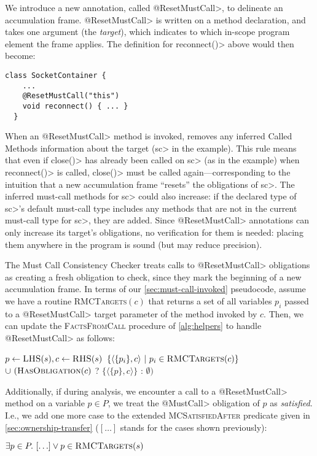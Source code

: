 We introduce a new annotation, called \<@ResetMustCall>, to delineate
an accumulation frame. \<@ResetMustCall> is written on a method
declaration, and takes one argument (the \emph{target}), which
indicates to which in-scope program element the frame applies. The
definition for \<reconnect()> above would then become:

\begin{lstlisting}[frame=tb,belowskip=3mm]
  class SocketContainer {
    ...
    @ResetMustCall("this")
    void reconnect() { ... }
  }
\end{lstlisting}
When an \<@ResetMustCall>
method is invoked, \Tool removes any
inferred Called Methods information about the target (\<sc> in the example).
This rule means that even if \<close()> has already been called on \<sc>
(as in the example)
when \<reconnect()>
is called, \<close()> must be called again---corresponding to the intuition
that a new accumulation frame ``resets'' the obligations of \<sc>.
The inferred must-call methods for \<sc> could also increase:
if the declared type of \<sc>'s default must-call type includes any
methods that are not in the current must-call type for \<sc>, they are added.
Since \<@ResetMustCall> annotations can only increase its target's obligations,
no verification for them is needed: placing them anywhere in the program is sound
(but may reduce precision).

The Must Call Consistency Checker treats calls to \<@ResetMustCall> obligations
as creating a fresh obligation to check, since they mark the beginning of a new
accumulation frame.  In terms of our \cref{sec:must-call-invoked} pseudocode,
assume we have a routine \textsc{RMCTargets}$(c)$ that returns a set of all
variables $p_i$ passed to a \<@ResetMustCall> target parameter of the method
invoked by $c$.  Then, we can update the \textsc{FactsFromCall} procedure of
\cref{alg:helpers} to handle \<@ResetMustCall> as follows:
\begin{algorithmic}
  \State $p \gets \textsc{LHS}(s), c \gets \textsc{RHS}(s)$
  \State \Return $\{ \langle \{ p_i \}, c \rangle\ |\ p_i \in \textsc{RMCTargets}(c) \}$ \newline
  \hspace*{5em} $\cup\ (\textsc{HasObligation}(c)$ ? $\{ \langle \{ p \}, c \rangle \}$ : $\emptyset)$
  \EndProcedure
  \end{algorithmic}
Additionally, if during analysis, we encounter a call to a \<@ResetMustCall>
method on a variable $p \in P$, we treat the \<@MustCall>
obligation of $p$ as \emph{satisfied}.  I.e., we add one more
case to the extended \textsc{MCSatisfiedAfter} predicate given in
\cref{sec:ownership-transfer} ($[\ldots]$ stands for the cases shown previously):
\begin{algorithmic}
  \State \Return $\exists p \in P .\ [\ldots] \vee p \in \textsc{RMCTargets}(s)$
  \EndProcedure
\end{algorithmic}

